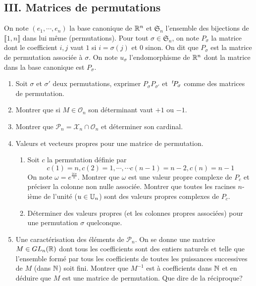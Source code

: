 \subsection*{III. Matrices de permutations}
On note $(e_1,\cdots,e_n)$ la base canonique de $\mathbb{R}^n$ et $\mathfrak{S}_n$ l'ensemble des bijections de $\llbracket 1,n \rrbracket$ dans lui même (permutations). Pour tout $\sigma \in \mathfrak{S}_n$, on note $P_\sigma$ la matrice dont le coefficient $i,j$ vaut $1$ si $i=\sigma(j)$ et $0$ sinon. On dit que $P_\sigma$ est la matrice de permutation associée à $\sigma$. On note $u_\sigma$ l'endomorphisme de $\mathbb{R}^n$ dont la matrice dans la base canonique est $P_\sigma$.
\begin{enumerate}
  \item Soit $\sigma$ et $\sigma'$ deux permutations, exprimer $P_\sigma P_{\sigma'}$ et $\,\mathstrut^t\! P_\sigma$ comme des matrices de permutation. 
  \item Montrer que si $M\in \mathcal{O}_n$ son déterminant vaut $+1$ ou $-1$.
  \item Montrer que $\mathcal{P}_n = \mathcal{X}_n \cap \mathcal{O}_n$ et déterminer son cardinal.
  \item Valeurs et vecteurs propres pour une matrice de permutation.
\begin{enumerate}
  \item Soit $c$ la permutation définie par
\begin{displaymath}
  c(1)=n, c(2)=1,\cdots, \cdots c(n-1)= n-2, c(n)=n-1
\end{displaymath}
On note $\omega = e^{\frac{2i\pi}{n}}$. Montrer que $\omega$ est une valeur propre complexe de $P_c$ et préciser la colonne non nulle associée. Montrer que toutes les racines $n$-ième de l'unité ($u\in \mathbb{U}_n$) sont des valeurs propres complexes de $P_c$. 
   \item Déterminer des valeurs propres (et les colonnes propres associées) pour une permutation $\sigma$ quelconque.
\end{enumerate}

  \item Une caractérisation des éléments de $\mathcal{P}_n$.\newline
On se donne une matrice $M\in GL_n(\mathbb{R})$ dont tous les coefficients sont des entiers naturels et telle que l'ensemble formé par tous les coefficients de toutes les puissances successives de $M$ (dans $\mathbb{N}$) soit fini.\newline
Montrer que $M^{-1}$ est à coefficients dans $\mathbb{N}$ et en déduire que $M$ est une matrice de permutation. Que dire de la réciproque?
\end{enumerate}

